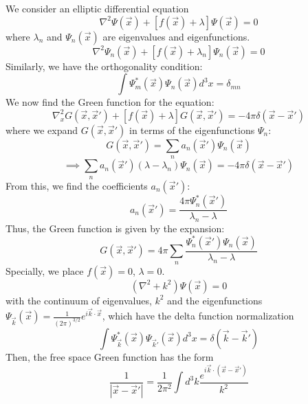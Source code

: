 \documentclass{article}
\begin{document}
	We consider an elliptic differential equation
	\[
	\nabla^2 \Psi(\vec{x}) + [f(\vec{x}) + \lambda] \Psi(\vec{x}) = 0
	\]
	where $\lambda_n$ and $\Psi_n(\vec{x})$ are eigenvalues and eigenfunctions.
	\[
	\nabla^2 \Psi_n(\vec{x}) + [f(\vec{x}) + \lambda_n] \Psi_n(\vec{x}) = 0
	\]
	Similarly, we have the orthogonality condition:
	\[
	\int \Psi_m^*(\vec{x}) \Psi_n(\vec{x}) d^3x = \delta_{mn}
	\]
	We now find the Green function for the equation:
	\[
	\nabla_x^2 G(\vec{x}, \vec{x}') + [f(\vec{x}) + \lambda] G(\vec{x}, \vec{x}') = -4\pi\delta(\vec{x} - \vec{x}')
	\]
	where we expand $G(\vec{x}, \vec{x}')$ in terms of the eigenfunctions $\Psi_n$:
	\[
	G(\vec{x}, \vec{x}') = \sum_n a_n(\vec{x}') \Psi_n(\vec{x})
	\]
	\[
	\implies \sum_n a_n(\vec{x}') (\lambda - \lambda_n) \Psi_n(\vec{x}) = -4\pi\delta(\vec{x} - \vec{x}')
	\]
	From this, we find the coefficients $a_n(\vec{x}')$:
	\[
	a_n(\vec{x}') = \frac{4\pi \Psi_n^*(\vec{x}')}{\lambda_n - \lambda}
	\]
	Thus, the Green function is given by the expansion:
	\[
	G(\vec{x}, \vec{x}') = 4\pi \sum_n \frac{\Psi_n^*(\vec{x}') \Psi_n(\vec{x})}{\lambda_n - \lambda}
	\]
	Specially, we place $f(\vec{x})=0$, $\lambda=0$.
	\[
	(\nabla^2 + k^2) \Psi(\vec{x}) = 0
	\]
	with the continuum of eigenvalues, $k^2$ and the eigenfunctions $\Psi_{\vec{k}}(\vec{x}) = \frac{1}{(2\pi)^{3/2}} e^{i\vec{k}\cdot\vec{x}}$, which have the delta function normalization
	\[
	\int \Psi_{\vec{k}}^*(\vec{x}) \Psi_{\vec{k}'}(\vec{x}) d^3x = \delta(\vec{k}-\vec{k}')
	\]
	Then, the free space Green function has the form
	\[
	\frac{1}{|\vec{x} - \vec{x}'|} = \frac{1}{2\pi^2} \int d^3k \frac{e^{i\vec{k}\cdot(\vec{x}-\vec{x}')}}{k^2}
	\]
	
\end{document}
